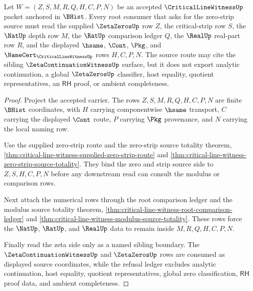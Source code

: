 \begin{theorem}
\label{thm:criticalline-witness-root-strip-source-totality}
Let $W=(Z,S,M,R,Q,H,C,P,N)$ be an accepted $\CriticalLineWitnessUp$ packet anchored in $\BHist$. Every root consumer that asks for the zero-strip source must read the supplied $\ZetaZerosUp$ row $Z$, the critical-strip row $S$, the $\NatUp$ depth row $M$, the $\RatUp$ comparison ledger $Q$, the $\RealUp$ real-part row $R$, and the displayed $\hsame$, $\Cont$, $\Pkg$, and $\NameCert_{\CriticalLineWitnessUp}$ rows $H,C,P,N$. The source route may cite the sibling $\ZetaContinuationWitnessUp$ surface, but it does not export analytic continuation, a global $\ZetaZerosUp$ classifier, host equality, quotient representatives, an $\mathsf{RH}$ proof, or ambient completeness.
\end{theorem}
\begin{proof}
Project the accepted carrier. The rows $Z,S,M,R,Q,H,C,P,N$ are finite $\BHist$ coordinates, with $H$ carrying componentwise $\hsame$ transport, $C$ carrying the displayed $\Cont$ route, $P$ carrying $\Pkg$ provenance, and $N$ carrying the local naming row.

Use the supplied zero-strip route and the zero-strip source totality theorem, \autoref{thm:critical-line-witness-supplied-zero-strip-route} and \autoref{thm:critical-line-witness-zero-strip-source-totality}. They bind the zero and strip source side to $Z,S,H,C,P,N$ before any downstream read can consult the modulus or comparison rows.

Next attach the numerical rows through the root comparison ledger and the modulus source totality theorem, \autoref{thm:critical-line-witness-root-comparison-ledger} and \autoref{thm:critical-line-witness-modulus-source-totality}. These rows force the $\NatUp$, $\RatUp$, and $\RealUp$ data to remain inside $M,R,Q,H,C,P,N$.

Finally read the zeta side only as a named sibling boundary. The $\ZetaContinuationWitnessUp$ and $\ZetaZerosUp$ rows are consumed as displayed source coordinates, while the refusal ledger excludes analytic continuation, host equality, quotient representatives, global zero classification, $\mathsf{RH}$ proof data, and ambient completeness.
\end{proof}

